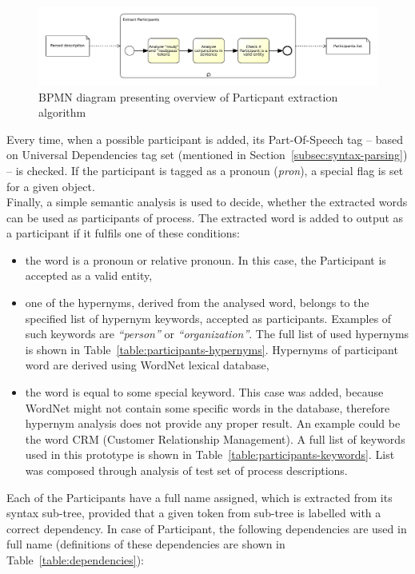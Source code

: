 \begin{figure}[H]
	\centering
	\includegraphics[width=\textwidth]{./images/participant_extraction_subprocess.pdf}
	\caption{BPMN diagram presenting overview of Particpant extraction algorithm}
	\label{fig:participant_extraction_subprocess}
\end{figure}
Every time, when a possible participant is added, its Part-Of-Speech tag -- based on Universal Dependencies tag set (mentioned in Section~\ref{subsec:syntax-parsing}) -- is checked. If the participant is tagged as a pronoun (\emph{pron}), a special flag is set for a given object.\\
Finally, a simple semantic analysis is used to decide, whether the extracted words can be used as participants of process. The extracted word is added to output as a participant if it fulfils one of these conditions:
\begin{itemize}
	\item the word is a pronoun or relative pronoun. In this case, the Participant is accepted as a valid entity,
	\item one of the hypernyms, derived from the analysed word, belongs to the specified list of hypernym keywords, accepted as participants. Examples of such keywords are \emph{``person''} or \emph{``organization''}. The full list of used hypernyms is shown in Table~\ref{table:participants-hypernyms}. Hypernyms of participant word are derived using WordNet lexical database,
	\item the word is equal to some special keyword. This case was added, because WordNet might not contain some specific words in the database, therefore hypernym analysis does not provide any proper result. An example could be the word CRM (Customer Relationship Management). A full list of keywords used in this prototype is shown in Table~\ref{table:participants-keywords}. List was composed through analysis of test set of process descriptions.
\end{itemize}	
Each of the Participants have a full name assigned, which is extracted from its syntax sub-tree, provided that a given token from sub-tree is labelled with a correct dependency. In case of Participant, the following dependencies are used in full name (definitions of these dependencies are shown in Table~\ref{table:dependencies}):
